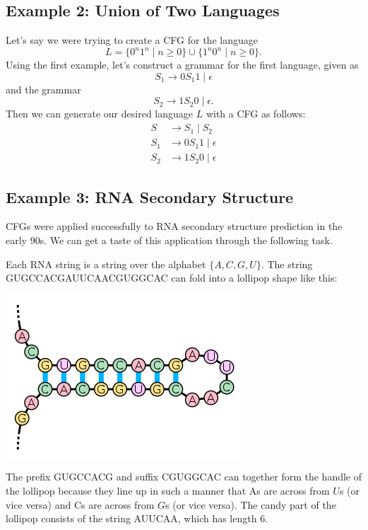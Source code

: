 \documentclass{article}
\begin{document}
    \subsection*{Example 2: Union of Two Languages}
    Let's say we were trying to create a CFG for the language $$L = \{0^{n}1^{n} \mid n \ge 0\} \cup \{1^{n}0^{n} \mid n \ge 0\}.$$ Using the first example, let's construct a grammar for the first language, given as $$S_{1} \rightarrow 0S_{1}1 \mid \epsilon$$ and the grammar $$S_{2} \rightarrow 1S_{2}0 \mid \epsilon.$$ Then we can generate our desired language $L$ with a CFG as follows:
    \begin{align*}
        S &\rightarrow S_{1} \mid S_{2} \\
        S_{1} &\rightarrow 0S_{1}1 \mid \epsilon \\
        S_{2} &\rightarrow 1S_{2}0 \mid \epsilon
    \end{align*}

\subsection*{Example 3: RNA Secondary Structure}
        CFGs were applied successfully to RNA secondary structure prediction in the early 90s. We can get a taste of this application through the following task.
        
        Each RNA string is a string over the alphabet $\{A, C, G, U\}$. The string GUGCCACGAUUCAACGUGGCAC can fold into a lollipop shape like this:
        \begin{center}
            \includegraphics[scale = 0.4]{stem-loop.png}
        \end{center}
        \qquad The prefix GUGCCACG and suffix CGUGGCAC can together form the handle of the lollipop because they line up in such a manner that As are across from $U$s (or vice versa) and Cs are across from $G$s (or vice versa). The candy part of the lollipop consists of the string AUUCAA, which has length 6.
\end{document}
